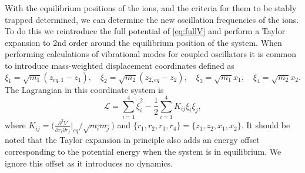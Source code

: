 With the equilibrium positions of the ions, and the criteria for them to be stably trapped determined, we can determine the new oscillation frequencies of the ions. To do this we reintroduce the full potential of \cref{eq:fullV} and perform a Taylor expansion to 2nd order around the equilibrium position of the system. When performing calculations of vibrational modes for coupled oscillators it is common to introduce mass-weighted displacement coordinates defined as
\begin{equation}
    \xi_1 = \sqrt{m_1}(z_{eq,1}-z_1),\quad \xi_2 = \sqrt{m_2}(z_{2,eq}-z_2),\quad \xi_3 = \sqrt{m_1}x_1,\quad \xi_4 = \sqrt{m_2}x_2.
\end{equation}
The Lagrangian in this coordinate system is
\begin{equation}
    \mathcal{L} = \sum_{i=1}^4 \dot{\xi}_i^2 - \frac{1}{2} \sum_{i = 1}^4K_{ij}\xi_i\xi_j,
\end{equation}
where $K_{ij} = \bigg(\frac{\partial^2 V}{\partial r_i\partial r_j}\bigg\vert_{eq}/\sqrt{m_im_j}\bigg)$ and $\{r_1,r_2,r_3,r_4\} = \{z_1,z_2,x_1,x_2\}$. It should be noted that the Taylor expansion in principle also adds an energy offset corresponding to the potential energy when the system is in equilibrium. We ignore this offset as it introduces no dynamics.

